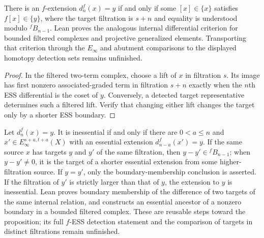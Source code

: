 \begin{proposition}
  \label{prop:fextension-iff-detected}
  \notready
  There is an $f$-extension $d_n^f(x)=y$ if and only if some
  $[x]\in\{x\}$ satisfies $f[x]\in\{y\}$, where the target filtration is
  $s+n$ and equality is understood modulo ${}^fB_{n-1}$.
  Lean proves the analogous internal differential criterion for bounded
  filtered complexes and projective generalized elements.  Transporting that
  criterion through the $E_\infty$ and abutment comparisons to the displayed
  homotopy detection sets remains unfinished.
\end{proposition}

\begin{proof}
  In the filtered two-term complex, choose a lift of $x$ in filtration $s$.
  Its image has first nonzero associated-graded term in filtration $s+n$
  exactly when the $n$th ESS differential is the coset of $y$.  Conversely,
  a detected target representative determines such a filtered lift.  Verify
  that changing either lift changes the target only by a shorter ESS boundary.
\end{proof}

\begin{proposition}
  \label{prop:fextension-inessential-iff-higher}
  \notready
  Let $d_n^f(x)=y$.  It is inessential if and only if there are
  $0<a\le n$ and $x'\in E_\infty^{s+a,t+a}(X)$ with an essential extension
  $d_{n-a}^f(x')=y$.  If the same source $x$ has targets $y$ and $y'$ of the
  same filtration, then $y-y'\in{}^fB_{n-1}$; when $y-y'\ne0$, it is the
  target of a shorter essential extension from some higher-filtration source.
  If $y=y'$, only the boundary-membership conclusion is asserted.  If the
  filtration of $y'$ is strictly larger than that of $y$, the extension to
  $y$ is inessential.
  Lean proves boundary membership of the difference of two targets of the
  same internal relation, and constructs an essential ancestor of a nonzero
  boundary in a bounded filtered complex.  These are reusable steps toward
  the proposition; its full $f$-ESS detection statement and the comparison of
  targets in distinct filtrations remain unfinished.
\end{proposition}

